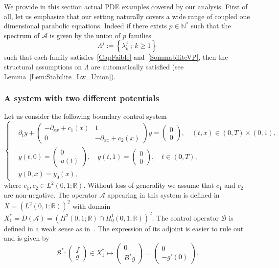 \documentclass[10pt]{amsart}
\theoremstyle{definition}\newtheorem{defi}[theo]{Definition}\newtheorem{rema}[theo]{Remark}\newtheorem{exam}[theo]{Example}\newtheorem{exem}[theo]{Example}\newtheorem{nota}[theo]{Notation}
\newcommand\A{\mathcal{A}}
\newcommand\B{\mathcal{B}}
\newcommand\Bs{\mathcal{B}^*}
\newcommand{\Xuns}{X_1^*}
\newcommand{\N}{\mathbb{N}}
\newcommand{\R}{\mathbb{R}}
\begin{document}
We provide in this section actual PDE examples covered by our analysis. First of all, let us emphasize that our setting naturally covers a wide range of coupled one dimensional parabolic equations. Indeed if there exists $p \in \N^*$ such that the spectrum of $\A$ is given by the union of $p$ families
\[
\Lambda^j := \left\{ \lambda_k^j \: ; \: k \geq 1 \right\}
\]
such that each family satisfies~\eqref{GapFaible} and~\eqref{SommabiliteVP}, then the structural assumptions on $\Lambda$ are automatically satisfied (see Lemma~\ref{Lem:Stabilite_Lw_Union}).



\subsubsection{A system with two different potentials} \label{sec_two_potentials}
Let us consider the following boundary control system
\begin{equation}\label{systeme_en_c}
\begin{cases}
& \partial_t y +
\begin{pmatrix} - \partial_{xx} + c_1(x) & 1 \\ 0 & -\partial_{xx} + c_2(x)
\end{pmatrix} y =
\begin{pmatrix} 0 \\ 0
\end{pmatrix},
\quad (t,x) \in (0,T) \times (0,1),
\\[0.15em] 
&y(t,0) =
\begin{pmatrix} 0 \\ u(t)
\end{pmatrix}, \quad y(t,1) =
\begin{pmatrix} 0 \\ 0
\end{pmatrix}, \quad t\in (0,T),
\\[0.15em] 
&y(0,x) = y_0(x),
\end{cases}
\end{equation}
where $c_1,c_2\in L^2(0,1;\R)$. Without loss of generality we assume that $c_1$ and $c_2$ are non-negative. The operator $\A$ appearing in this system is defined in $X=(L^2(0,1 ; \R))^2$ with domain $\Xuns=D(\A)= \left(H^2(0,1 ; \R) \cap H^1_0 (0,1 ; \R) \right)^2$. The control operator $\B$ is defined in a weak sense as in~\cite{TucsnakWeissBook}. The expression of its adjoint is easier to rule out and is given by
\[
\Bs :
\begin{pmatrix} f \\ g
\end{pmatrix} \in \Xuns \mapsto
\begin{pmatrix} 0 \\ B^* g
\end{pmatrix} =
\begin{pmatrix} 0 \\ -g'(0)
\end{pmatrix}.
\]
\end{document}
